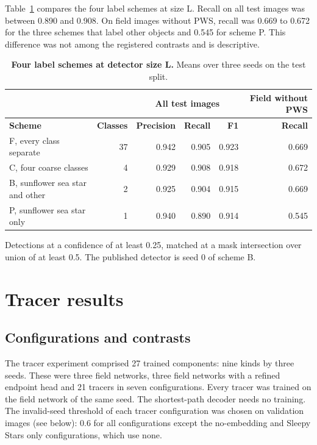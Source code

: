 Table~\ref{tab:schemes} compares the four label schemes at size L.
Recall on all test images was between 0.890 and 0.908.
On field images without PWS, recall was 0.669 to 0.672 for the three schemes that label other objects and 0.545 for scheme P.
This difference was not among the registered contrasts and is descriptive.

\begin{table}[!htbp]
\centering
\caption{\textbf{Four label schemes at detector size L.} Means over three seeds on the test split.}
\label{tab:schemes}
{\small
\begin{tabular}{|l|r|r|r|r|r|}
\hline
 & & \multicolumn{3}{c|}{\textbf{All test images}} & \textbf{Field without PWS} \\ \hline
\textbf{Scheme} & \textbf{Classes} & \textbf{Precision} & \textbf{Recall} & \textbf{F1} & \textbf{Recall} \\ \thickhline
F, every class separate & 37 & 0.942 & 0.905 & 0.923 & 0.669 \\ \hline
C, four coarse classes & 4 & 0.929 & 0.908 & 0.918 & 0.672 \\ \hline
B, sunflower sea star and other & 2 & 0.925 & 0.904 & 0.915 & 0.669 \\ \hline
P, sunflower sea star only & 1 & 0.940 & 0.890 & 0.914 & 0.545 \\ \hline
\end{tabular}
}
\begin{flushleft}\small
Detections at a confidence of at least 0.25, matched at a mask intersection over union of at least 0.5.
The published detector is seed 0 of scheme B.
\end{flushleft}
\end{table}

\section*{Tracer results}

\subsection*{Configurations and contrasts}

The tracer experiment comprised 27 trained components: nine kinds by three seeds.
These were three field networks, three field networks with a refined endpoint head and 21 tracers in seven configurations.
Every tracer was trained on the field network of the same seed.
The shortest-path decoder needs no training.
The invalid-seed threshold of each tracer configuration was chosen on validation images (see below): 0.6 for all configurations except the no-embedding and Sleepy Stars only configurations, which use none.

